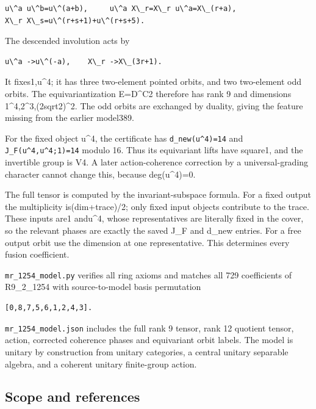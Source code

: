 \begin{verbatim}
u\^a u\^b=u\^(a+b),     u\^a X\_r=X\_r u\^a=X\_(r+a),
X\_r X\_s=u\^(r+s+1)+u\^(r+s+5).
\end{verbatim}

The descended involution acts by

\begin{verbatim}
u\^a ->u\^(-a),    X\_r ->X\_(3r+1).
\end{verbatim}

It fixes1,u\^{}4; it has three two-element pointed orbits, and two
two-element odd orbits. The equivariantization E=D\^{}C2 therefore has
rank 9 and dimensions 1\^{}4,2\^{}3,(2sqrt2)\^{}2. The odd orbits are
exchanged by duality, giving the feature missing from the earlier
model389.

For the fixed object u\^{}4, the certificate has
\texttt{d\_\allowbreak{}new(u\textasciicircum{}\allowbreak{}4)=14} and
\texttt{J\_\allowbreak{}F(u\textasciicircum{}4,\allowbreak{}u\textasciicircum{}4;1)\allowbreak{}=14}
modulo 16. Thus its equivariant lifts have square1, and the invertible
group is V4. A later action-coherence correction by a universal-grading
character cannot change this, because deg(u\^{}4)=0.

The full tensor is computed by the invariant-subspace formula. For a
fixed output the multiplicity is(dim+trace)/2; only fixed input objects
contribute to the trace. These inputs are1 andu\^{}4, whose
representatives are literally fixed in the cover, so the relevant phases
are exactly the saved J\_F and d\_new entries. For a free output orbit
use the dimension at one representative. This determines every fusion
coefficient.

\texttt{mr\_\allowbreak{}1254\_\allowbreak{}model.\allowbreak{}py}
verifies all ring axioms and matches all 729 coefficients of R9\_2\_1254
with source-to-model basis permutation

\begin{verbatim}
[0,8,7,5,6,1,2,4,3].
\end{verbatim}

\texttt{mr\_\allowbreak{}1254\_\allowbreak{}model.\allowbreak{}json}
includes the full rank 9 tensor, rank 12 quotient tensor, action,
corrected coherence phases and equivariant orbit labels. The model is
unitary by construction from unitary categories, a central unitary
separable algebra, and a coherent unitary finite-group action.

\hypertarget{scope-and-references}{%
\subsection{Scope and references}\label{scope-and-references}}

